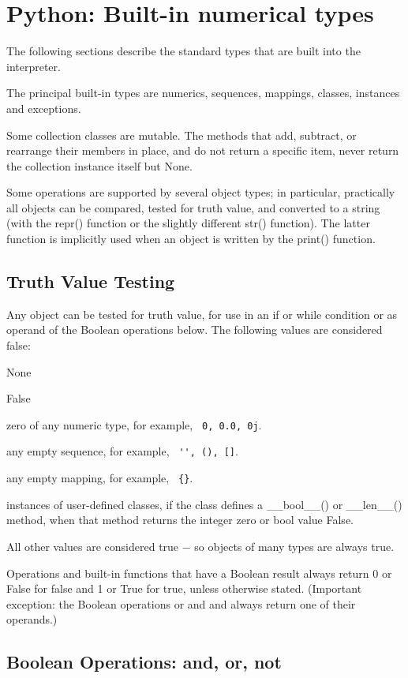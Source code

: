 \chapter{Python: Built-in numerical types}


The following sections describe the standard types that are built into the interpreter.

The principal built-in types are numerics, sequences, mappings, classes, instances and exceptions.

Some collection classes are mutable. The methods that add, subtract, or rearrange their members in place, and do not return a specific item, never return the collection instance itself but None.

Some operations are supported by several object types; in particular, practically all objects can be compared, tested for truth value, and converted to a string (with the repr() function or the slightly different str() function). The latter function is implicitly used when an object is written by the print() function.

\section{Truth Value Testing}

Any object can be tested for truth value, for use in an if or while condition or as operand of the Boolean operations below. The following values are considered false:

\vpara
None

False

zero of any numeric type, for example, \verb| 0, 0.0, 0j|.

any empty sequence, for example, \verb| '', (), []|.

any empty mapping, for example, \verb| {}|.

instances of user-defined classes, if the class defines a \_\_bool\_\_() or \_\_len\_\_() method, when that method returns the integer zero or bool value False.

\vpara
All other values are considered true $-$ so objects of many types are always true.

Operations and built-in functions that have a Boolean result always return 0 or False for false and 1 or True for true, unless otherwise stated. (Important exception: the Boolean operations or and and always return one of their operands.)

\section{Boolean Operations:  and, or, not}

